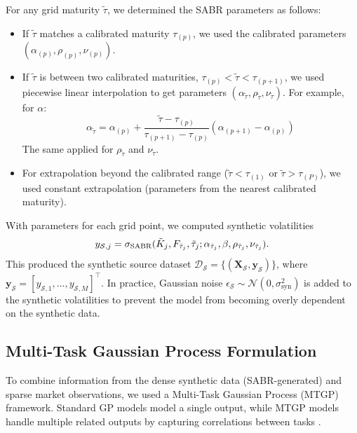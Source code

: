 \documentclass[preprint,12pt]{elsarticle}
\begin{document}
For any grid maturity $\tilde{\tau}$, we determined the SABR parameters as follows:
\begin{itemize}
    \item If $\tilde{\tau}$ matches a calibrated maturity $\tau_{(p)}$, we used the calibrated parameters $(\alpha_{(p)}, \rho_{(p)}, \nu_{(p)})$.
    
    \item If $\tilde{\tau}$ is between two calibrated maturities, $\tau_{(p)} < \tilde{\tau} < \tau_{(p+1)}$, we used piecewise linear interpolation to get parameters $(\alpha_{\tilde\tau}, \rho_{\tilde\tau}, \nu_{\tilde\tau})$. For example, for $\alpha$:
    \begin{equation} \label{eq:interpolation}
    \alpha_{\tilde\tau} = \alpha_{(p)} + \frac{\tilde{\tau}-\tau_{(p)}}{\tau_{(p+1)}-\tau_{(p)}}(\alpha_{(p+1)}-\alpha_{(p)})
    \end{equation}
    The same applied for $\rho_{\tilde\tau}$ and $\nu_{\tilde\tau}$.
    
    \item For extrapolation beyond the calibrated range ($\tilde{\tau} < \tau_{(1)}$ or $\tilde{\tau} > \tau_{(P)}$), we used constant extrapolation (parameters from the nearest calibrated maturity).
\end{itemize}

With parameters for each grid point, we computed synthetic volatilities $$y_{\mathcal{S},j} = \sigma_{\rm SABR}(\tilde{K}_j, F_{\tilde{\tau}_j},\tilde{\tau}_j;\alpha_{\tilde{\tau}_j}, \beta, \rho_{{\tilde\tau}_j}, \nu_{{\tilde\tau}_j}).$$ This produced the synthetic source dataset $\mathcal{D}_\mathcal{S} = \{(\mathbf{X}_\mathcal{S}, \mathbf{y}_\mathcal{S})\}$, where $\mathbf{y}_\mathcal{S}=[y_{\mathcal{S},1},\dots,y_{\mathcal{S},M}]^\intercal$. In practice, Gaussian noise $ \epsilon_{\mathcal{S}} \sim \mathcal{N}(0, \sigma^2_{\text{syn}})$ is added to the synthetic volatilities to prevent the model from becoming overly dependent on the synthetic data.

\subsection{Multi-Task Gaussian Process Formulation}

To combine information from the dense synthetic data (SABR-generated) and sparse market observations, we used a Multi-Task Gaussian Process (MTGP) framework. Standard GP models model a single output, while MTGP models handle multiple related outputs by capturing correlations between tasks \citep{bonilla2007multi, alvarez2012kernels}. 
\end{document}
